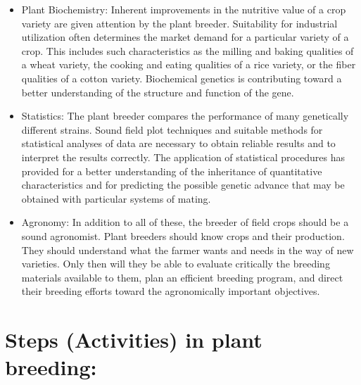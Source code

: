 \documentclass[11pt,ignorenonframetext,aspectratio=169]{beamer}
\providecommand{\tightlist}{%
  \setlength{\itemsep}{0pt}\setlength{\parskip}{0pt}}
\begin{document}
\begin{frame}{}
\protect\hypertarget{section-14}{}
\small

\begin{itemize}
\tightlist
\item
  Plant Biochemistry: Inherent improvements in the nutritive value of a
  crop variety are given attention by the plant breeder. Suitability for
  industrial utilization often determines the market demand for a
  particular variety of a crop. This includes such characteristics as
  the milling and baking qualities of a wheat variety, the cooking and
  eating qualities of a rice variety, or the fiber qualities of a cotton
  variety. Biochemical genetics is contributing toward a better
  understanding of the structure and function of the gene.
\item
  Statistics: The plant breeder compares the performance of many
  genetically different strains. Sound field plot techniques and
  suitable methods for statistical analyses of data are necessary to
  obtain reliable results and to interpret the results correctly. The
  application of statistical procedures has provided for a better
  understanding of the inheritance of quantitative characteristics and
  for predicting the possible genetic advance that may be obtained with
  particular systems of mating.
\item
  Agronomy: In addition to all of these, the breeder of field crops
  should be a sound agronomist. Plant breeders should know crops and
  their production. They should understand what the farmer wants and
  needs in the way of new varieties. Only then will they be able to
  evaluate critically the breeding materials available to them, plan an
  efficient breeding program, and direct their breeding efforts toward
  the agronomically important objectives.
\end{itemize}
\end{frame}

\hypertarget{steps-activities-in-plant-breeding}{%
\section{Steps (Activities) in plant
breeding:}\label{steps-activities-in-plant-breeding}}
\end{document}
